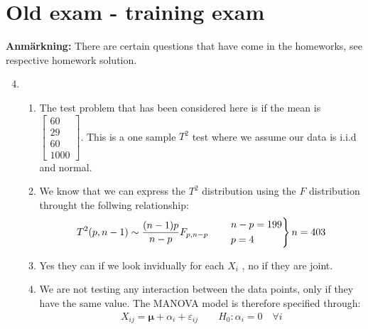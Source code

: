 \section{Old exam - training exam}
\noindent\textbf{Anmärkning:} There are certain questions that have come in the homeworks, see respective homework solution. 
\par\bigskip

\begin{enumerate}[label=\arabic*., leftmargin=*]
  \setcounter{enumi}{3}
  \item
  \begin{enumerate}[label=\alph*),leftmargin=*]
  \item The test problem that has been considered here is if the mean is $\begin{bmatrix}60\\29\\60\\1000\end{bmatrix}$. This is a one sample $T^2$ test where we assume our data is i.i.d and normal.
    \par\bigskip
  \item We know that we can express the $T^2$ distribution using the $F$ distribution throught the follwing relationship:
    \begin{equation*}
      \begin{gathered}
        T^2(p,n-1)\sim \dfrac{(n-1)p}{n-p}F_{p,n-p}\qquad 
        \begin{rcases*}
          n-p = 199\\p=4
        \end{rcases*}n = 403
      \end{gathered}
    \end{equation*}
    \par\bigskip
  \item Yes they can if we look invidually for each $X_i$ , no if they are joint.
    \par\bigskip
  \item We are not testing any interaction between the data points, only if they have the same value. The MANOVA model is therefore specified through:
    \begin{equation*}
      \begin{gathered}
        X_{ij} = \mathbf{\mu}+\alpha_i+\varepsilon_{ij}\qquad H_0:\alpha_i = 0\quad\forall i
      \end{gathered}
    \end{equation*}
    \par\bigskip

\end{enumerate}
\end{enumerate}
